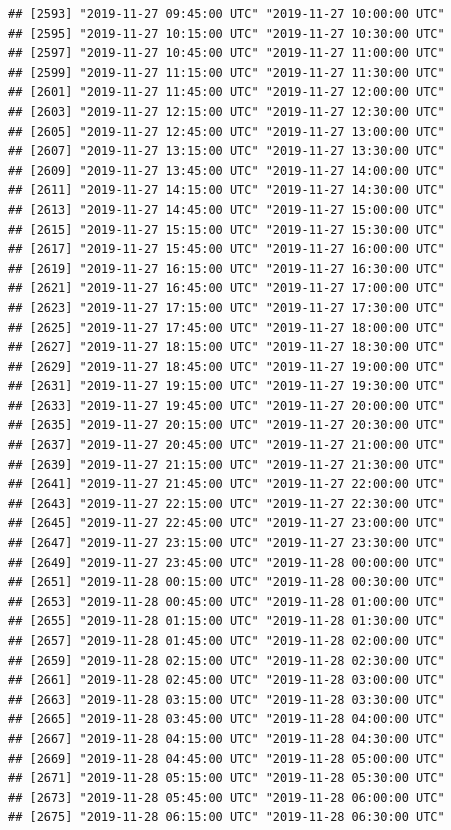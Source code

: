 \documentclass{article}\usepackage[]{graphicx}\usepackage[]{color}
\makeatletter
\newenvironment{kframe}{%
 \def\at@end@of@kframe{}%
 \ifinner\ifhmode%
  \def\at@end@of@kframe{\end{minipage}}%
  \begin{minipage}{\columnwidth}%
 \fi\fi%
 \def\FrameCommand##1{\hskip\@totalleftmargin \hskip-\fboxsep
 \colorbox{shadecolor}{##1}\hskip-\fboxsep
     \hskip-\linewidth \hskip-\@totalleftmargin \hskip\columnwidth}%
 \MakeFramed {\advance\hsize-\width
   \@totalleftmargin\z@ \linewidth\hsize
   \@setminipage}}%
 {\par\unskip\endMakeFramed%
 \at@end@of@kframe}
\newenvironment{knitrout}{}{} %
\makeatother
\begin{document}
\begin{knitrout}
\begin{kframe}
\begin{verbatim}
## [2593] "2019-11-27 09:45:00 UTC" "2019-11-27 10:00:00 UTC"
## [2595] "2019-11-27 10:15:00 UTC" "2019-11-27 10:30:00 UTC"
## [2597] "2019-11-27 10:45:00 UTC" "2019-11-27 11:00:00 UTC"
## [2599] "2019-11-27 11:15:00 UTC" "2019-11-27 11:30:00 UTC"
## [2601] "2019-11-27 11:45:00 UTC" "2019-11-27 12:00:00 UTC"
## [2603] "2019-11-27 12:15:00 UTC" "2019-11-27 12:30:00 UTC"
## [2605] "2019-11-27 12:45:00 UTC" "2019-11-27 13:00:00 UTC"
## [2607] "2019-11-27 13:15:00 UTC" "2019-11-27 13:30:00 UTC"
## [2609] "2019-11-27 13:45:00 UTC" "2019-11-27 14:00:00 UTC"
## [2611] "2019-11-27 14:15:00 UTC" "2019-11-27 14:30:00 UTC"
## [2613] "2019-11-27 14:45:00 UTC" "2019-11-27 15:00:00 UTC"
## [2615] "2019-11-27 15:15:00 UTC" "2019-11-27 15:30:00 UTC"
## [2617] "2019-11-27 15:45:00 UTC" "2019-11-27 16:00:00 UTC"
## [2619] "2019-11-27 16:15:00 UTC" "2019-11-27 16:30:00 UTC"
## [2621] "2019-11-27 16:45:00 UTC" "2019-11-27 17:00:00 UTC"
## [2623] "2019-11-27 17:15:00 UTC" "2019-11-27 17:30:00 UTC"
## [2625] "2019-11-27 17:45:00 UTC" "2019-11-27 18:00:00 UTC"
## [2627] "2019-11-27 18:15:00 UTC" "2019-11-27 18:30:00 UTC"
## [2629] "2019-11-27 18:45:00 UTC" "2019-11-27 19:00:00 UTC"
## [2631] "2019-11-27 19:15:00 UTC" "2019-11-27 19:30:00 UTC"
## [2633] "2019-11-27 19:45:00 UTC" "2019-11-27 20:00:00 UTC"
## [2635] "2019-11-27 20:15:00 UTC" "2019-11-27 20:30:00 UTC"
## [2637] "2019-11-27 20:45:00 UTC" "2019-11-27 21:00:00 UTC"
## [2639] "2019-11-27 21:15:00 UTC" "2019-11-27 21:30:00 UTC"
## [2641] "2019-11-27 21:45:00 UTC" "2019-11-27 22:00:00 UTC"
## [2643] "2019-11-27 22:15:00 UTC" "2019-11-27 22:30:00 UTC"
## [2645] "2019-11-27 22:45:00 UTC" "2019-11-27 23:00:00 UTC"
## [2647] "2019-11-27 23:15:00 UTC" "2019-11-27 23:30:00 UTC"
## [2649] "2019-11-27 23:45:00 UTC" "2019-11-28 00:00:00 UTC"
## [2651] "2019-11-28 00:15:00 UTC" "2019-11-28 00:30:00 UTC"
## [2653] "2019-11-28 00:45:00 UTC" "2019-11-28 01:00:00 UTC"
## [2655] "2019-11-28 01:15:00 UTC" "2019-11-28 01:30:00 UTC"
## [2657] "2019-11-28 01:45:00 UTC" "2019-11-28 02:00:00 UTC"
## [2659] "2019-11-28 02:15:00 UTC" "2019-11-28 02:30:00 UTC"
## [2661] "2019-11-28 02:45:00 UTC" "2019-11-28 03:00:00 UTC"
## [2663] "2019-11-28 03:15:00 UTC" "2019-11-28 03:30:00 UTC"
## [2665] "2019-11-28 03:45:00 UTC" "2019-11-28 04:00:00 UTC"
## [2667] "2019-11-28 04:15:00 UTC" "2019-11-28 04:30:00 UTC"
## [2669] "2019-11-28 04:45:00 UTC" "2019-11-28 05:00:00 UTC"
## [2671] "2019-11-28 05:15:00 UTC" "2019-11-28 05:30:00 UTC"
## [2673] "2019-11-28 05:45:00 UTC" "2019-11-28 06:00:00 UTC"
## [2675] "2019-11-28 06:15:00 UTC" "2019-11-28 06:30:00 UTC"

\end{verbatim}
\end{kframe}
\end{knitrout}
\end{document}
